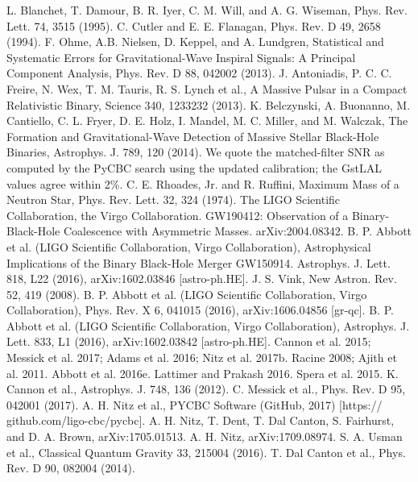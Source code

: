\documentclass[binding=0.6cm, LaM]{sapthesis}
\begin{document}
\begin{thebibliography}{500}
	 L. Blanchet, T. Damour, B. R. Iyer, C. M. Will, and A. G. Wiseman, Phys. Rev. Lett. 74, 3515 (1995).
	 C. Cutler and E. E. Flanagan, Phys. Rev. D 49, 2658 (1994). 
	 F. Ohme, A.B. Nielsen, D. Keppel, and A. Lundgren, Statistical and Systematic Errors for Gravitational-Wave Inspiral Signals: A Principal Component Analysis, Phys. Rev. D 88, 042002 (2013). 
	 J. Antoniadis, P. C. C. Freire, N. Wex, T. M. Tauris, R. S. Lynch et al., A Massive Pulsar in a Compact Relativistic Binary, Science 340, 1233232 (2013). 
	 K. Belczynski, A. Buonanno, M. Cantiello, C. L. Fryer, D. E. Holz, I. Mandel, M. C. Miller, and M. Walczak, The Formation and Gravitational-Wave Detection of Massive Stellar Black-Hole Binaries, Astrophys. J. 789, 120 (2014). 
	 We quote the matched-filter SNR as computed by the PyCBC search using the updated calibration; the GstLAL values agree within 2\%. 
	 C. E. Rhoades, Jr. and R. Ruffini, Maximum Mass of a Neutron Star, Phys. Rev. Lett. 32, 324 (1974).
         The LIGO Scientific Collaboration, the Virgo Collaboration. GW190412: Observation of a Binary-Black-Hole Coalescence with Asymmetric Masses. arXiv:2004.08342.
	 B. P. Abbott et al. (LIGO Scientific Collaboration, Virgo Collaboration), Astrophysical Implications of the Binary Black-Hole Merger GW150914. Astrophys. J. Lett. 818, L22 (2016), arXiv:1602.03846 [astro-ph.HE]. 
	 J. S. Vink, New Astron. Rev. 52, 419 (2008).
	 B. P. Abbott et al. (LIGO Scientific Collaboration, Virgo Collaboration), Phys. Rev. X 6, 041015 (2016), arXiv:1606.04856 [gr-qc]. 
	 B. P. Abbott et al. (LIGO Scientific Collaboration, Virgo Collaboration), Astrophys. J. Lett. 833, L1 (2016), arXiv:1602.03842 [astro-ph.HE]. 
	 Cannon et al. 2015; Messick et al. 2017; Adams et al. 2016; Nitz et al. 2017b.
	 Racine 2008; Ajith et al. 2011.
	 Abbott et al. 2016e.
	 Lattimer and Prakash 2016.
	 Spera et al. 2015.
	 K. Cannon et al., Astrophys. J. 748, 136 (2012).
	 C. Messick et al., Phys. Rev. D 95, 042001 (2017).
	 A. H. Nitz et al., PYCBC Software (GitHub, 2017) [https:// github.com/ligo-cbc/pycbc].
	 A. H. Nitz, T. Dent, T. Dal Canton, S. Fairhurst, and D. A. Brown, arXiv:1705.01513.
	 A. H. Nitz, arXiv:1709.08974.
	 S. A. Usman et al., Classical Quantum Gravity 33, 215004 (2016).
	 T. Dal Canton et al., Phys. Rev. D 90, 082004 (2014). 

\end{thebibliography}
\end{document}
